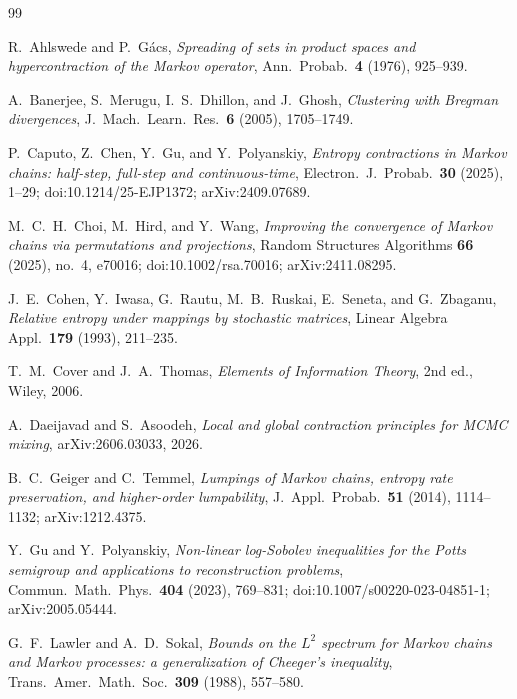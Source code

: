 \documentclass[11pt]{article}
\begin{document}
\begin{thebibliography}{99}
\raggedright

R.~Ahlswede and P.~G\'acs,
\emph{Spreading of sets in product spaces and hypercontraction of the
Markov operator},
Ann.\ Probab.\ \textbf{4} (1976), 925--939.

A.~Banerjee, S.~Merugu, I.~S.~Dhillon, and J.~Ghosh,
\emph{Clustering with Bregman divergences},
J.\ Mach.\ Learn.\ Res.\ \textbf{6} (2005), 1705--1749.

P.~Caputo, Z.~Chen, Y.~Gu, and Y.~Polyanskiy,
\emph{Entropy contractions in Markov chains: half-step, full-step and
continuous-time},
Electron.\ J.\ Probab.\ \textbf{30} (2025), 1--29;
doi:10.1214/25-EJP1372; arXiv:2409.07689.

M.~C.~H.~Choi, M.~Hird, and Y.~Wang,
\emph{Improving the convergence of Markov chains via permutations and
projections},
Random Structures Algorithms \textbf{66} (2025), no.~4, e70016;
doi:10.1002/rsa.70016; arXiv:2411.08295.

J.~E.~Cohen, Y.~Iwasa, G.~Rautu, M.~B.~Ruskai, E.~Seneta, and G.~Zbaganu,
\emph{Relative entropy under mappings by stochastic matrices},
Linear Algebra Appl.\ \textbf{179} (1993), 211--235.

T.~M.~Cover and J.~A.~Thomas,
\emph{Elements of Information Theory},
2nd ed., Wiley, 2006.

A.~Daeijavad and S.~Asoodeh,
\emph{Local and global contraction principles for MCMC mixing},
arXiv:2606.03033, 2026.

B.~C.~Geiger and C.~Temmel,
\emph{Lumpings of Markov chains, entropy rate preservation, and
higher-order lumpability},
J.\ Appl.\ Probab.\ \textbf{51} (2014), 1114--1132;
arXiv:1212.4375.

Y.~Gu and Y.~Polyanskiy,
\emph{Non-linear log-Sobolev inequalities for the Potts semigroup and
applications to reconstruction problems},
Commun.\ Math.\ Phys.\ \textbf{404} (2023), 769--831;
doi:10.1007/s00220-023-04851-1; arXiv:2005.05444.

G.~F.~Lawler and A.~D.~Sokal,
\emph{Bounds on the \(L^2\) spectrum for Markov chains and Markov
processes: a generalization of Cheeger's inequality},
Trans.\ Amer.\ Math.\ Soc.\ \textbf{309} (1988), 557--580.


\end{thebibliography}
\end{document}
